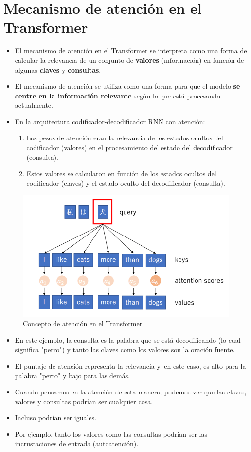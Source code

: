 \section{Mecanismo de atención en el Transformer}
\begin{itemize}
  \item El mecanismo de atención en el Transformer se interpreta como una forma de calcular la relevancia de un conjunto de \textbf{valores} (información) en función de algunas \textbf{claves} y \textbf{consultas}.
  \item El mecanismo de atención se utiliza como una forma para que el modelo \textbf{se centre en la información relevante} según lo que está procesando actualmente.
  \item En la arquitectura codificador-decodificador RNN con atención:
  \begin{enumerate}
    \item Los pesos de atención eran la relevancia de los estados ocultos del codificador (valores) en el procesamiento del estado del decodificador (consulta).
    \item Estos valores se calcularon en función de los estados ocultos del codificador (claves) y el estado oculto del decodificador (consulta).
  \end{enumerate}
\end{itemize}
\begin{figure}[h]
  \centering
  \includegraphics[scale=0.2]{pics/attention_concept.png}
  \caption{Concepto de atención en el Transformer.}
\end{figure}
\begin{itemize}
  \item En este ejemplo, la consulta es la palabra que se está decodificando (lo cual significa "perro") y tanto las claves como los valores son la oración fuente.
  \item El puntaje de atención representa la relevancia y, en este caso, es alto para la palabra "perro" y bajo para las demás.
  \item Cuando pensamos en la atención de esta manera, podemos ver que las claves, valores y consultas podrían ser cualquier cosa.
  \item Incluso podrían ser iguales.
  \item Por ejemplo, tanto los valores como las consultas podrían ser las incrustaciones de entrada (autoatención).
  \end{itemize}

